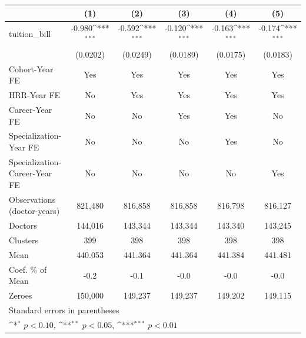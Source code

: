 {
\def\sym#1{\ifmmode^{#1}\else\(^{#1}\)\fi}
\begin{tabular}{l*{5}{c}}
\hline\hline
                    &\multicolumn{1}{c}{(1)}         &\multicolumn{1}{c}{(2)}         &\multicolumn{1}{c}{(3)}         &\multicolumn{1}{c}{(4)}         &\multicolumn{1}{c}{(5)}         \\
\hline
tuition\_bill        &      -0.980\sym{***}&      -0.592\sym{***}&      -0.120\sym{***}&      -0.163\sym{***}&      -0.174\sym{***}\\
                    &    (0.0202)         &    (0.0249)         &    (0.0189)         &    (0.0175)         &    (0.0183)         \\
[1em]
Cohort-Year FE      &         Yes         &         Yes         &         Yes         &         Yes         &         Yes         \\
[1em]
HRR-Year FE         &          No         &         Yes         &         Yes         &         Yes         &         Yes         \\
[1em]
Career-Year FE      &          No         &          No         &         Yes         &         Yes         &          No         \\
[1em]
Specialization-Year FE&          No         &          No         &          No         &         Yes         &          No         \\
[1em]
Specialization-Career-Year FE&          No         &          No         &          No         &          No         &         Yes         \\
\hline
Observations (doctor-years)&     821,480         &     816,858         &     816,858         &     816,798         &     816,127         \\
Doctors             &     144,016         &     143,344         &     143,344         &     143,340         &     143,245         \\
Clusters            &         399         &         398         &         398         &         398         &         398         \\
Mean                &     440.053         &     441.364         &     441.364         &     441.384         &     441.481         \\
Coef. \% of Mean    &        -0.2         &        -0.1         &        -0.0         &        -0.0         &        -0.0         \\
Zeroes              &     150,000         &     149,237         &     149,237         &     149,202         &     149,115         \\
\hline\hline
\multicolumn{6}{l}{\footnotesize Standard errors in parentheses}\\
\multicolumn{6}{l}{\footnotesize \sym{*} \(p<0.10\), \sym{**} \(p<0.05\), \sym{***} \(p<0.01\)}\\
\end{tabular}
}
